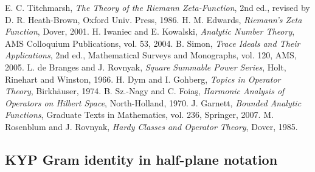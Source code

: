 \documentclass[11pt]{article}
\theoremstyle{definition}
\theoremstyle{remark}
\begin{document}
\begin{thebibliography}{9}
 E. C. Titchmarsh, \emph{The Theory of the Riemann Zeta-Function}, 2nd ed., revised by D. R. Heath-Brown, Oxford Univ. Press, 1986.
 H. M. Edwards, \emph{Riemann's Zeta Function}, Dover, 2001.
 H. Iwaniec and E. Kowalski, \emph{Analytic Number Theory}, AMS Colloquium Publications, vol. 53, 2004.
 B. Simon, \emph{Trace Ideals and Their Applications}, 2nd ed., Mathematical Surveys and Monographs, vol. 120, AMS, 2005.
 L. de Branges and J. Rovnyak, \emph{Square Summable Power Series}, Holt, Rinehart and Winston, 1966.
 H. Dym and I. Gohberg, \emph{Topics in Operator Theory}, Birkhäuser, 1974.
 B. Sz.-Nagy and C. Foia\c{s}, \emph{Harmonic Analysis of Operators on Hilbert Space}, North-Holland, 1970.
 J. Garnett, \emph{Bounded Analytic Functions}, Graduate Texts in Mathematics, vol. 236, Springer, 2007.
 M. Rosenblum and J. Rovnyak, \emph{Hardy Classes and Operator Theory}, Dover, 1985.
\end{thebibliography}
\fi

\subsection{KYP Gram identity in half-plane notation}\label{app:KYP-gram}
\end{document}
